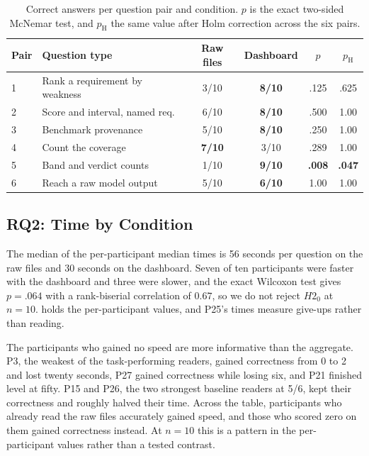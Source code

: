 \documentclass[10pt,conference,a4paper]{IEEEtran}
\newcommand{\best}[1]{\textbf{#1}}
\newcommand{\tblsetup}{%
  \footnotesize%
  \setlength{\tabcolsep}{3pt}%
  \renewcommand{\arraystretch}{1.02}%
}
\begin{document}
\begin{table}[t]
  \caption{Correct answers per question pair and condition. $p$ is the exact two-sided McNemar test, and $p_{\mathrm{H}}$ the same value after Holm correction across the six pairs.}
  \label{tab:pairs}
  \centering
  \tblsetup
  \begin{tabularx}{\columnwidth}{@{}l X c c c c@{}}
    \toprule
    Pair & Question type & Raw files & Dashboard & $p$ & $p_{\mathrm{H}}$ \\
    \midrule
    1 & Rank a requirement by weakness & 3/10 & \best{8/10} & .125 & .625 \\
    2 & Score and interval, named req. & 6/10 & \best{8/10} & .500 & 1.00 \\
    3 & Benchmark provenance & 5/10 & \best{8/10} & .250 & 1.00 \\
    4 & Count the coverage & \best{7/10} & 3/10 & .289 & 1.00 \\
    5 & Band and verdict counts & 1/10 & \best{9/10} & \best{.008} & \best{.047} \\
    6 & Reach a raw model output & 5/10 & \best{6/10} & 1.00 & 1.00 \\
    \bottomrule
  \end{tabularx}
\end{table}

\subsection{RQ2: Time by Condition}
The median of the per-participant median times is 56 seconds per question on the raw files and 30 seconds on the dashboard.
Seven of ten participants were faster with the dashboard and three were slower, and the exact Wilcoxon test gives $p = .064$ with a rank-biserial correlation of $0.67$, so we do not reject $H2_0$ at $n = 10$.
 holds the per-participant values, and P25's times measure give-ups rather than reading.

The participants who gained no speed are more informative than the aggregate.
P3, the weakest of the task-performing readers, gained correctness from 0 to 2 and lost twenty seconds, P27 gained correctness while losing six, and P21 finished level at fifty.
P15 and P26, the two strongest baseline readers at 5/6, kept their correctness and roughly halved their time.
Across the table, participants who already read the raw files accurately gained speed, and those who scored zero on them gained correctness instead.
At $n = 10$ this is a pattern in the per-participant values rather than a tested contrast.
\end{document}
